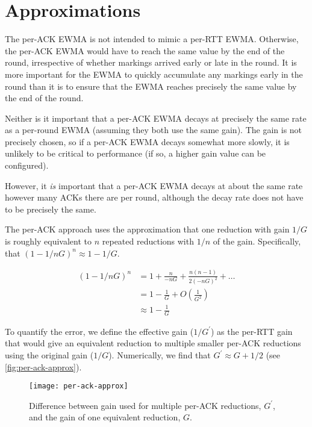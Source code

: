 \section{Approximations}\label{prresp_approx}

The per-ACK EWMA is not intended to mimic a per-RTT EWMA. Otherwise, the per-ACK
EWMA would have to reach the same value by the end of the round, irrespective of
whether markings arrived early or late in the round.
It is more important for the EWMA to quickly accumulate any markings early in
the round than it is to ensure that the EWMA reaches precisely the same value by
the end of the round. 

Neither is it important that a per-ACK EWMA decays at precisely the same rate as
a per-round EWMA (assuming they both use the same gain). The gain is not
precisely chosen, so if a per-ACK EWMA decays somewhat more slowly, it is
unlikely to be critical to performance (if so, a higher gain value can be
configured).

However, it \emph{is} important that a per-ACK EWMA decays at about the same
rate however many ACKs there are per round, although the decay rate does not
have to be precisely the same.

The per-ACK approach uses the approximation that one reduction with gain \(1/G\)
is roughly equivalent to \(n\) repeated reductions with \(1/n\) of the gain.
Specifically, that \((1 - 1/nG)^n \approx 1 - 1/G\).

\begin{align*}
(1 - 1/nG)^n &=       1 + \frac{n}{-nG} + \frac{n(n-1)}{2(-nG)^2} + \ldots \\
             &=       1 - \frac{1}{G} + O\left(\frac{1}{G^2}\right)\\
             &\approx 1 - \frac{1}{G}
\end{align*}

To quantify the error, we define the effective gain
(\(1/G^\prime\)) as the per-RTT gain that would give an equivalent reduction to
multiple smaller per-ACK reductions using the original gain (\(1/G\)).
Numerically, we find that \(G^\prime \approx G + 1/2\) (see \autoref{fig:per-ack-approx}).

\begin{figure}[h]
	\texttt{[image: per-ack-approx]}
	\caption{Difference between gain used for multiple per-ACK reductions, \(G^\prime\), and the gain of one equivalent reduction, \(G\).}
	\label{fig:per-ack-approx}
\end{figure}

